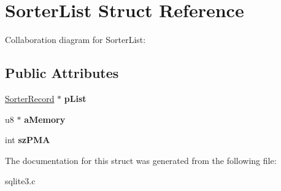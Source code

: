 \hypertarget{structSorterList}{}\section{Sorter\+List Struct Reference}
\label{structSorterList}


Collaboration diagram for Sorter\+List\+:
\subsection*{Public Attributes}
\begin{DoxyCompactItemize}
\item 
\hyperlink{structSorterRecord}{Sorter\+Record} $\ast$ {\bfseries p\+List}\hypertarget{structSorterList_a913640b1b917acccd7a851483f9d4e2b}{}\label{structSorterList_a913640b1b917acccd7a851483f9d4e2b}

\item 
u8 $\ast$ {\bfseries a\+Memory}\hypertarget{structSorterList_ae0c7c3714fd8c61b806a5767ce686344}{}\label{structSorterList_ae0c7c3714fd8c61b806a5767ce686344}

\item 
int {\bfseries sz\+P\+MA}\hypertarget{structSorterList_a4d14b7e48b155f6b79dd6fd37645b73c}{}\label{structSorterList_a4d14b7e48b155f6b79dd6fd37645b73c}

\end{DoxyCompactItemize}


The documentation for this struct was generated from the following file\+:\begin{DoxyCompactItemize}
\item 
sqlite3.\+c\end{DoxyCompactItemize}
